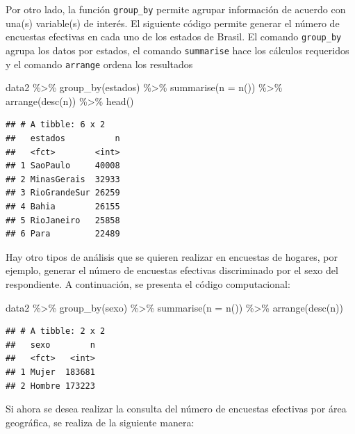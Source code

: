 \documentclass[
  12pt,
]{book}
\newenvironment{Shaded}{\begin{snugshade}}{\end{snugshade}}
\newcommand{\AttributeTok}[1]{\textcolor[rgb]{0.77,0.63,0.00}{#1}}
\newcommand{\FunctionTok}[1]{\textcolor[rgb]{0.00,0.00,0.00}{#1}}
\newcommand{\NormalTok}[1]{#1}
\newcommand{\SpecialCharTok}[1]{\textcolor[rgb]{0.00,0.00,0.00}{#1}}
\begin{document}
Por otro lado, la función \texttt{group\_by} permite agrupar información de acuerdo con una(s) variable(s) de interés. El siguiente código permite generar el número de encuestas efectivas en cada uno de los estados de Brasil. El comando \texttt{group\_by} agrupa los datos por estados, el comando \texttt{summarise} hace los cálculos requeridos y el comando \texttt{arrange} ordena los resultados

\begin{Shaded}
\begin{Highlighting}[]
\NormalTok{data2 }\SpecialCharTok{\%\textgreater{}\%} 
  \FunctionTok{group\_by}\NormalTok{(estados) }\SpecialCharTok{\%\textgreater{}\%} 
  \FunctionTok{summarise}\NormalTok{(}\AttributeTok{n =} \FunctionTok{n}\NormalTok{()) }\SpecialCharTok{\%\textgreater{}\%} \FunctionTok{arrange}\NormalTok{(}\FunctionTok{desc}\NormalTok{(n)) }\SpecialCharTok{\%\textgreater{}\%} \FunctionTok{head}\NormalTok{()}
\end{Highlighting}
\end{Shaded}

\begin{verbatim}
## # A tibble: 6 x 2
##   estados          n
##   <fct>        <int>
## 1 SaoPaulo     40008
## 2 MinasGerais  32933
## 3 RioGrandeSur 26259
## 4 Bahia        26155
## 5 RioJaneiro   25858
## 6 Para         22489
\end{verbatim}

Hay otro tipos de análisis que se quieren realizar en encuestas de hogares, por ejemplo, generar el número de encuestas efectivas discriminado por el sexo del respondiente. A continuación, se presenta el código computacional:

\begin{Shaded}
\begin{Highlighting}[]
\NormalTok{data2 }\SpecialCharTok{\%\textgreater{}\%} 
  \FunctionTok{group\_by}\NormalTok{(sexo) }\SpecialCharTok{\%\textgreater{}\%} 
  \FunctionTok{summarise}\NormalTok{(}\AttributeTok{n =} \FunctionTok{n}\NormalTok{()) }\SpecialCharTok{\%\textgreater{}\%} \FunctionTok{arrange}\NormalTok{(}\FunctionTok{desc}\NormalTok{(n)) }
\end{Highlighting}
\end{Shaded}

\begin{verbatim}
## # A tibble: 2 x 2
##   sexo        n
##   <fct>   <int>
## 1 Mujer  183681
## 2 Hombre 173223
\end{verbatim}

Si ahora se desea realizar la consulta del número de encuestas efectivas por área geográfica, se realiza de la siguiente manera:
\end{document}
